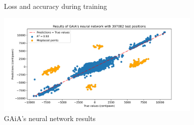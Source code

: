 \documentclass[unnumsec,webpdf,contemporary,large]{Article}%
\theoremstyle{thmstyleone}%
\theoremstyle{thmstyletwo}%
\theoremstyle{thmstylethree}%
\begin{document}
\begin{figure}[H]
  \captionsetup[subfigure]{labelformat=empty}
  \centering
  \\
  \caption{Loss and accuracy during training}
  \label{fig:history}
\end{figure}

\begin{figure}[H]
  \centering
  \includegraphics[width=10cm]{result.png}
  \caption{GAiA's neural network results}
  \label{fig:result}
\end{figure}
\end{document}
